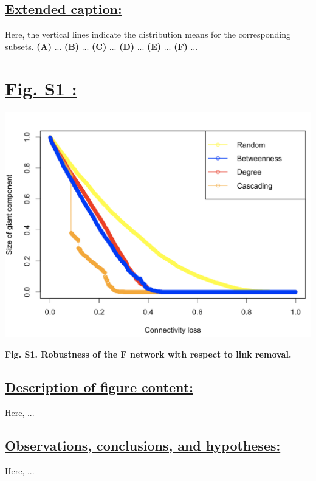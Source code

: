 \documentclass{article}\usepackage[]{graphicx}\usepackage[]{color}
\begin{document}
\subsection*{\underline{Extended caption:}}
\par{Here, the vertical lines indicate the distribution means for the corresponding subsets. \textbf{(A)} ... \textbf{(B)} ... \textbf{(C)} ... \textbf{(D)} ... \textbf{(E)} ... \textbf{(F)} ... }

\newpage
\section*{\underline{Fig. S1 :}}
\begin{center}
\includegraphics[scale=0.4]{S1.png}
\newline
\par{\textbf{Fig. S1. Robustness of the F network with respect to link removal.}}
\end{center}
\subsection*{\underline{Description of figure content:}}
\par{Here, ...}
\subsection*{\underline{Observations, conclusions, and hypotheses:}}
\par{Here, ...}

\newpage
\end{document}
